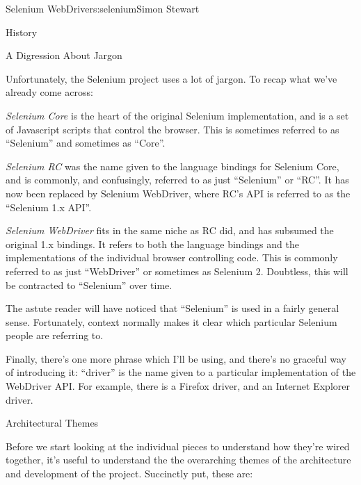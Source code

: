 \begin{aosachapter}{Selenium WebDriver}{s:selenium}{Simon Stewart}
\begin{aosasect1}{History}
\end{aosasect1}

\begin{aosasect1}{A Digression About Jargon}

Unfortunately, the Selenium project uses a lot of jargon.  To recap
what we've already come across:

\begin{aosaitemize}

  \item \emph{Selenium Core} is the heart of the original Selenium implementation,
  and is a set of Javascript scripts that control the browser. This is
  sometimes referred to as ``Selenium'' and sometimes as ``Core''.

  \item \emph{Selenium RC} was the name given to the language bindings for Selenium
  Core, and is commonly, and confusingly, referred to as just
  ``Selenium'' or ``RC''.  It has now been replaced by Selenium
  WebDriver, where RC's API is referred to as the ``Selenium 1.x API''.

  \item \emph{Selenium WebDriver} fits in the same niche as RC did, and has subsumed
  the original 1.x bindings.  It refers to both the language bindings
  and the implementations of the individual browser controlling
  code. This is commonly referred to as just ``WebDriver'' or sometimes
  as Selenium 2. Doubtless, this will be contracted to ``Selenium'' over
  time.

\end{aosaitemize}

The astute reader will have noticed that ``Selenium'' is used in a
fairly general sense. Fortunately, context normally makes it clear
which particular Selenium people are referring to.

Finally, there's one more phrase which I'll be using, and there's no
graceful way of introducing it: ``driver'' is the name given to a
particular implementation of the WebDriver API\@. For example, there is
a Firefox driver, and an Internet Explorer driver.

\end{aosasect1}

\begin{aosasect1}{Architectural Themes}

Before we start looking at the individual pieces to understand how
they're wired together, it's useful to understand the the overarching
themes of the architecture and development of the project. Succinctly
put, these are:


\end{aosasect1}
\end{aosachapter}
